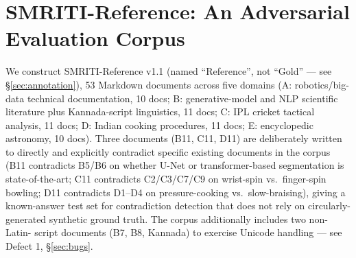 \section{SMRITI-Reference: An Adversarial Evaluation Corpus}
\label{sec:corpus}

We construct SMRITI-Reference v1.1 (named ``Reference'', not ``Gold'' ---
see \S\ref{sec:annotation}), 53 Markdown documents across five domains (A:
robotics/big-data technical documentation, 10 docs; B: generative-model and
NLP scientific literature plus Kannada-script linguistics, 11 docs; C: IPL
cricket tactical analysis, 11 docs; D: Indian cooking procedures, 11 docs;
E: encyclopedic astronomy, 10 docs). Three documents (B11, C11, D11) are
deliberately written to directly and explicitly contradict specific
existing documents in the corpus (B11 contradicts B5/B6 on whether U-Net or
transformer-based segmentation is state-of-the-art; C11 contradicts
C2/C3/C7/C9 on wrist-spin vs.\ finger-spin bowling; D11 contradicts D1--D4
on pressure-cooking vs.\ slow-braising), giving a known-answer test set for
contradiction detection that does not rely on circularly-generated
synthetic ground truth. The corpus additionally includes two non-Latin-
script documents (B7, B8, Kannada) to exercise Unicode handling --- see
Defect 1, \S\ref{sec:bugs}.
